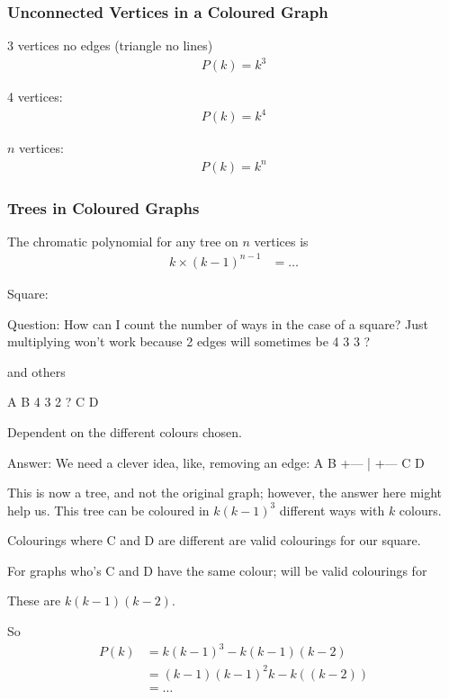 \subsubsection{Unconnected Vertices in a Coloured Graph}
\label{sec:UnconnectedVerticesInAColouredGraph}

3 vertices no edges (triangle no lines)
\begin{align}
  P(k) = k^{3}
\end{align}

4 vertices:
\begin{align}
  P(k) = k^{4}
\end{align}

$n$ vertices:
\begin{align}
  P(k) = k^{n}
\end{align}

\subsubsection{Trees in Coloured Graphs}
\label{sec:TreesInColouredGraphs}

The chromatic polynomial for any tree on $n$ vertices is
\begin{align}
  k \times (k-1)^{n-1} & = \ldots
\end{align}

Square:

Question: How can I count the number of ways in the case of a square? Just multiplying
won't work because 2 edges will sometimes be
4 3
3 ?

and others

A  B
4  3
2  ?
C  D

Dependent on the different colours chosen.

Answer: We need a clever idea, like, removing an edge:
A  B
+---
|
+---
C  D

This is now a tree, and not the original graph; however, the answer here might help us.
This tree can be coloured in $k(k-1)^{3}$ different ways with $k$ colours.

Colourings where C and D are different are valid colourings for our square. 

For graphs who's C and D have the same colour; will be valid colourings for


These are $k(k-1)(k-2)$.

So
\begin{align}
  P(k) & = k(k-1)^{3} - k(k-1)(k-2) \\
  & = (k-1)(k-1)^{2}k - k((k-2)) \\
  & = \ldots
\end{align}

